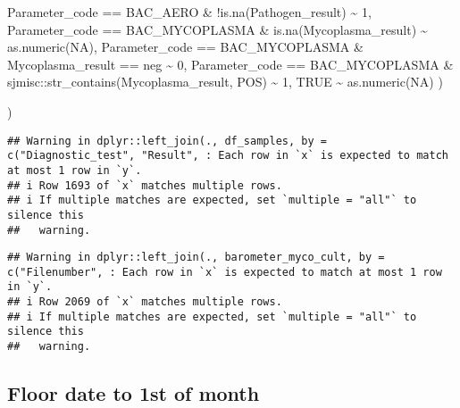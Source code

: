 \documentclass[
]{article}
\newenvironment{Shaded}{\begin{snugshade}}{\end{snugshade}}
\newcommand{\ConstantTok}[1]{\textcolor[rgb]{0.00,0.00,0.00}{#1}}
\newcommand{\DecValTok}[1]{\textcolor[rgb]{0.00,0.00,0.81}{#1}}
\newcommand{\FunctionTok}[1]{\textcolor[rgb]{0.00,0.00,0.00}{#1}}
\newcommand{\NormalTok}[1]{#1}
\newcommand{\SpecialCharTok}[1]{\textcolor[rgb]{0.00,0.00,0.00}{#1}}
\newcommand{\StringTok}[1]{\textcolor[rgb]{0.31,0.60,0.02}{#1}}
\begin{document}
\begin{Shaded}
\begin{Highlighting}[]
\NormalTok{      Parameter\_code }\SpecialCharTok{==} \StringTok{\textquotesingle{}BAC\_AERO\textquotesingle{}} \SpecialCharTok{\&} \SpecialCharTok{!}\FunctionTok{is.na}\NormalTok{(Pathogen\_result) }\SpecialCharTok{\textasciitilde{}} \DecValTok{1}\NormalTok{, }
\NormalTok{      Parameter\_code }\SpecialCharTok{==} \StringTok{\textquotesingle{}BAC\_MYCOPLASMA\textquotesingle{}} \SpecialCharTok{\&} \FunctionTok{is.na}\NormalTok{(Mycoplasma\_result) }\SpecialCharTok{\textasciitilde{}} \FunctionTok{as.numeric}\NormalTok{(}\ConstantTok{NA}\NormalTok{),}
\NormalTok{      Parameter\_code }\SpecialCharTok{==} \StringTok{\textquotesingle{}BAC\_MYCOPLASMA\textquotesingle{}} \SpecialCharTok{\&}\NormalTok{ Mycoplasma\_result }\SpecialCharTok{==} \StringTok{\textquotesingle{}neg\textquotesingle{}} \SpecialCharTok{\textasciitilde{}} \DecValTok{0}\NormalTok{,}
\NormalTok{      Parameter\_code }\SpecialCharTok{==} \StringTok{\textquotesingle{}BAC\_MYCOPLASMA\textquotesingle{}} \SpecialCharTok{\&}\NormalTok{ sjmisc}\SpecialCharTok{::}\FunctionTok{str\_contains}\NormalTok{(Mycoplasma\_result, }\StringTok{\textquotesingle{}POS\textquotesingle{}}\NormalTok{) }\SpecialCharTok{\textasciitilde{}} \DecValTok{1}\NormalTok{,}
      \ConstantTok{TRUE} \SpecialCharTok{\textasciitilde{}} \FunctionTok{as.numeric}\NormalTok{(}\ConstantTok{NA}\NormalTok{)}
\NormalTok{    )}

\NormalTok{  )}
\end{Highlighting}
\end{Shaded}

\begin{verbatim}
## Warning in dplyr::left_join(., df_samples, by = c("Diagnostic_test", "Result", : Each row in `x` is expected to match at most 1 row in `y`.
## i Row 1693 of `x` matches multiple rows.
## i If multiple matches are expected, set `multiple = "all"` to silence this
##   warning.
\end{verbatim}

\begin{verbatim}
## Warning in dplyr::left_join(., barometer_myco_cult, by = c("Filenumber", : Each row in `x` is expected to match at most 1 row in `y`.
## i Row 2069 of `x` matches multiple rows.
## i If multiple matches are expected, set `multiple = "all"` to silence this
##   warning.
\end{verbatim}

\hypertarget{floor-date-to-1st-of-month}{%
\subsection{Floor date to 1st of
month}\label{floor-date-to-1st-of-month}}
\end{document}
